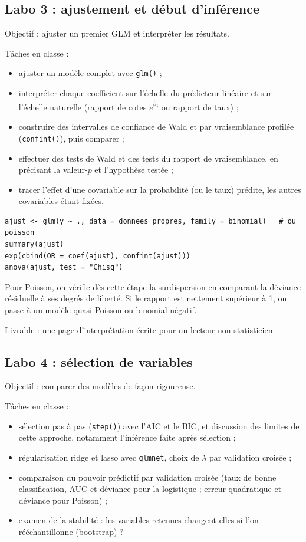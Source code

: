 \documentclass[11pt,letterpaper]{scrartcl}
\begin{document}
\subsection{Labo 3 : ajustement et début d'inférence}

Objectif : ajuster un premier GLM et interpréter les résultats.

Tâches en classe :
\begin{itemize}
  \item ajuster un modèle complet avec \texttt{glm()} ;
  \item interpréter chaque coefficient sur l'échelle du prédicteur linéaire et sur l'échelle naturelle (rapport de cotes $e^{\hat\beta_j}$ ou rapport de taux) ;
  \item construire des intervalles de confiance de Wald et par vraisemblance profilée (\texttt{confint()}), puis comparer ;
  \item effectuer des tests de Wald et des tests du rapport de vraisemblance, en précisant la valeur-$p$ et l'hypothèse testée ;
  \item tracer l'effet d'une covariable sur la probabilité (ou le taux) prédite, les autres covariables étant fixées.
\end{itemize}

\begin{lstlisting}
ajust <- glm(y ~ ., data = donnees_propres, family = binomial)   # ou poisson
summary(ajust)
exp(cbind(OR = coef(ajust), confint(ajust)))
anova(ajust, test = "Chisq")
\end{lstlisting}

\begin{envremarque}
Pour Poisson, on vérifie dès cette étape la surdispersion en comparant la déviance résiduelle à ses degrés de liberté. Si le rapport est nettement supérieur à 1, on passe à un modèle quasi-Poisson ou binomial négatif.
\end{envremarque}

Livrable : une page d'interprétation écrite pour un lecteur non statisticien.

\subsection{Labo 4 : sélection de variables}

Objectif : comparer des modèles de façon rigoureuse.

Tâches en classe :
\begin{itemize}
  \item sélection pas à pas (\texttt{step()}) avec l'AIC et le BIC, et discussion des limites de cette approche, notamment l'inférence faite après sélection ;
  \item régularisation ridge et lasso avec \texttt{glmnet}, choix de $\lambda$ par validation croisée ;
  \item comparaison du pouvoir prédictif par validation croisée (taux de bonne classification, AUC et déviance pour la logistique ; erreur quadratique et déviance pour Poisson) ;
  \item examen de la stabilité : les variables retenues changent-elles si l'on rééchantillonne (bootstrap) ?
\end{itemize}
\end{document}
